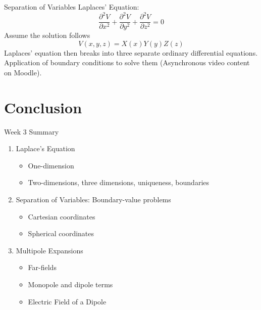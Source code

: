 \documentclass{beamer}
\begin{document}
\begin{frame}{Separation of Variables}
Laplaces' Equation:
\begin{equation}
\frac{\partial^2 V}{\partial x^2} + \frac{\partial^2 V}{\partial y^2} + \frac{\partial^2 V}{\partial z^2} = 0
\end{equation}
Assume the solution follows
\begin{equation}
V(x,y,z) = X(x) Y(y) Z(z)
\end{equation}
Laplaces' equation then breaks into three separate ordinary differential equations. Application of boundary conditions to solve them (Asynchronous video content on Moodle).
\end{frame}

\section{Conclusion}

\begin{frame}{Week 3 Summary}
\begin{enumerate}
\item Laplace's Equation
\begin{itemize}
\item One-dimension
\item Two-dimensions, three dimensions, uniqueness, boundaries
\end{itemize}
\item Separation of Variables: Boundary-value problems
\begin{itemize}
\item Cartesian coordinates
\item Spherical coordinates
\end{itemize}
\item Multipole Expansions
\begin{itemize}
\item Far-fields
\item Monopole and dipole terms
\item Electric Field of a Dipole
\end{itemize}
\end{enumerate}
\end{frame}
\end{document}
